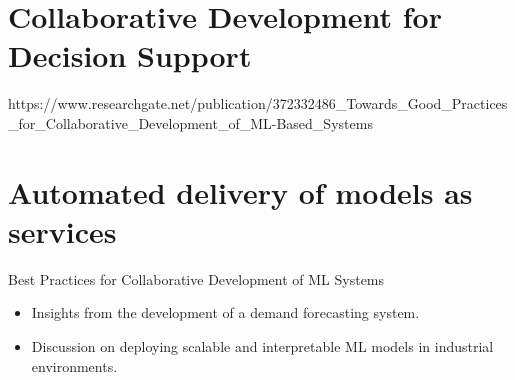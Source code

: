 

\section{Collaborative Development for Decision Support}
\label{sec:collaborative_development}
https://www.researchgate.net/publication/372332486_Towards_Good_Practices_for_Collaborative_Development_of_ML-Based_Systems





\section{Automated delivery of models as services}

Best Practices for Collaborative Development of ML Systems
\begin{itemize}
\item Insights from the development of a demand forecasting system.
\item Discussion on deploying scalable and interpretable ML models in industrial environments.
\end{itemize}


